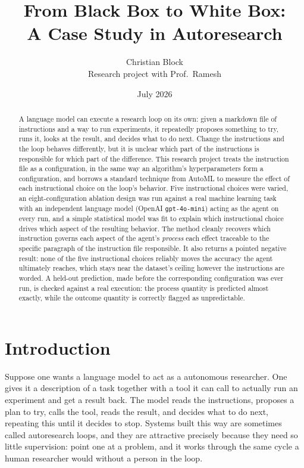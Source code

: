 \documentclass[11pt]{article}
\title{From Black Box to White Box:\\A Case Study in Autoresearch}
\author{Christian Block\\\small Research project with Prof.\ Ramesh}
\date{July 2026}
\begin{document}
\maketitle

\begin{abstract}
A language model can execute a research loop on its own: given a markdown file of instructions and a way to run experiments, it repeatedly proposes something to try, runs it, looks at the result, and decides what to do next. Change the instructions and the loop behaves differently, but it is unclear which part of the instructions is responsible for which part of the difference. This research project treats the instruction file as a configuration, in the same way an algorithm's hyperparameters form a configuration, and borrows a standard technique from AutoML to measure the effect of each instructional choice on the loop's behavior. Five instructional choices were varied, an eight-configuration ablation design was run against a real machine learning task with an independent language model (OpenAI \texttt{gpt-4o-mini}) acting as the agent on every run, and a simple statistical model was fit to explain which instructional choice drives which aspect of the resulting behavior. The method cleanly recovers which instruction governs each aspect of the agent's \emph{process} each effect traceable to the specific paragraph of the instruction file responsible. It also returns a pointed negative result: none of the five instructional choices reliably moves the accuracy the agent ultimately reaches, which stays near the dataset's ceiling however the instructions are worded. A held-out prediction, made before the corresponding configuration was ever run, is checked against a real execution: the process quantity is predicted almost exactly, while the outcome quantity is correctly flagged as unpredictable.
\end{abstract}

\section{Introduction}

Suppose one wants a language model to act as a autonomous researcher. One gives it a description of a task together with a tool it can call to actually run an experiment and get a result back. The model reads the instructions, proposes a plan to try, calls the tool, reads the result, and decides what to do next, repeating this until it decides to stop. Systems built this way are sometimes called autoresearch loops, and they are attractive precisely because they need so little supervision: point one at a problem, and it works through the same cycle a human researcher would without a person in the loop.
\end{document}
